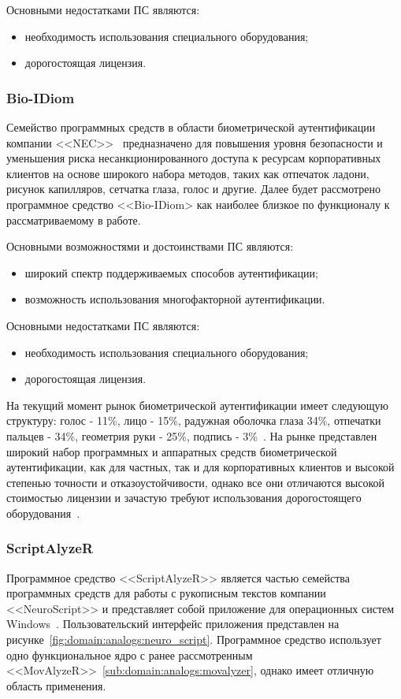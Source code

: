 Основными недостатками ПС являются:
\begin{itemize}
  \item необходимость использования специального оборудования;
  \item дорогостоящая лицензия.
\end{itemize}

\subsubsection{Bio-IDiom}
\label{sub:domain:analogs:nec}
Семейство программных средств в области биометрической аутентификации компании <<NEC>>~\cite{analogs_nec} предназначено для повышения уровня безопасности и уменьшения риска несанкционированного доступа к ресурсам корпоративных клиентов на основе широкого набора методов, таких как отпечаток ладони, рисунок капилляров, сетчатка глаза, голос и другие. Далее будет рассмотрено программное средство <<Bio-IDiom> как наиболее близкое по функционалу к рассматриваемому в работе.

Основными возможностями и достоинствами ПС являются:
\begin{itemize}
  \item широкий спектр поддерживаемых способов аутентификации;
  \item возможность использования многофакторной аутентификации.
\end{itemize}

Основными недостатками ПС являются:
\begin{itemize}
  \item необходимость использования специального оборудования;
  \item дорогостоящая лицензия.
\end{itemize}

На текущий момент рынок биометрической аутентификации имеет следующую структуру: голос - 11\%, лицо - 15\%, радужная оболочка глаза 34\%, отпечатки пальцев - 34\%, геометрия руки - 25\%, подпись - 3\%~\cite{vorona}.
На рынке представлен широкий набор программных и аппаратных средств биометрической аутентификации, как для частных, так и для корпоративных клиентов и высокой степенью точности и отказоустойчивости, однако все они отличаются высокой стоимостью лицензии и зачастую требуют использования дорогостоящего оборудования~\cite{wacom_lcd}.

\subsubsection{ScriptAlyzeR}
\label{sub:domain:analogs:neuro_script}
Программное средство <<ScriptAlyzeR>> является частью семейства программных средств для работы с рукописным текстов компании <<NeuroScript>> и представляет собой приложение для операционных систем Windows~\cite{analogs_scriptAlyzer}. Пользовательский интерфейс приложения представлен на рисунке~\ref{fig:domain:analogs:neuro_script}. Программное средство использует одно функциональное ядро с ранее рассмотренным <<MovAlyzeR>>~\ref{sub:domain:analogs:movalyzer}, однако имеет отличную область применения.

